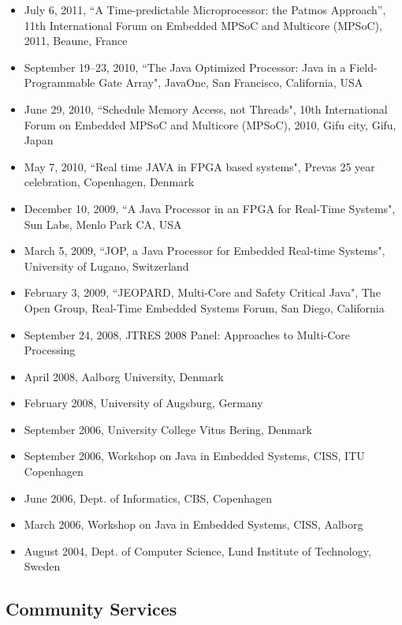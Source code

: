 \documentclass[%
    a4paper,
    11pt, %
    headinclude, footexclude,
    notitlepage,
    headsepline,
    pointlessnumbers,
    ]{scrartcl}
\begin{document}
\begin{itemize}
  \item July 6, 2011, ``A Time-predictable Microprocessor: the Patmos Approach'',
      11th International Forum on Embedded MPSoC and Multicore (MPSoC), 2011, Beaune, France
  \item September 19--23, 2010, ``The Java Optimized Processor: Java in a Field-Programmable Gate Array",
      JavaOne, San Francisco, California, USA
  \item June 29, 2010, ``Schedule Memory Access, not Threads",
      10th International Forum on Embedded MPSoC and Multicore (MPSoC), 2010, Gifu city, Gifu, Japan
  \item May 7, 2010, ``Real time JAVA in FPGA based systems",
      Prevas 25 year celebration, Copenhagen, Denmark
  \item December 10, 2009, ``A Java Processor in an FPGA for
      Real-Time Systems", Sun Labs, Menlo Park CA, USA
  \item March 5, 2009, ``JOP, a Java Processor for Embedded
      Real-time Systems", University of Lugano, Switzerland
  \item February 3, 2009, ``JEOPARD, Multi-Core and Safety
      Critical Java", The Open Group, Real-Time Embedded Systems
      Forum, San Diego, California
  \item September 24, 2008, JTRES 2008 Panel: Approaches to
      Multi-Core Processing
  \item April 2008, Aalborg University, Denmark
  \item February 2008, University of Augsburg, Germany
  \item September 2006, University College Vitus Bering, Denmark
  \item September 2006, Workshop on Java in Embedded Systems,
      CISS, ITU Copenhagen
  \item June 2006,  Dept. of Informatics, CBS, Copenhagen
  \item March 2006, Workshop on Java in Embedded Systems, CISS,
      Aalborg
  \item August 2004, Dept. of Computer Science, Lund Institute of
      Technology, Sweden

\end{itemize}

\subsection*{Community Services}
\end{document}
